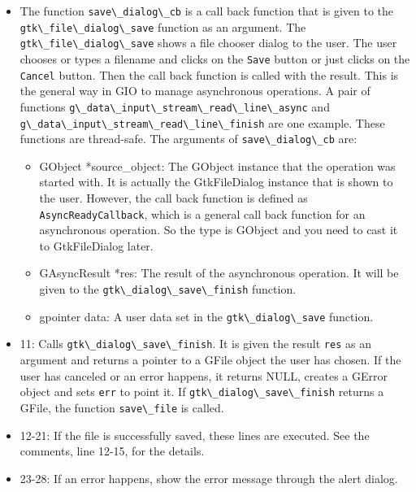\begin{itemize}
\tightlist
\item
  The function \passthrough{\lstinline!save\_dialog\_cb!} is a call back
  function that is given to the
  \passthrough{\lstinline!gtk\_file\_dialog\_save!} function as an
  argument. The \passthrough{\lstinline!gtk\_file\_dialog\_save!} shows
  a file chooser dialog to the user. The user chooses or types a
  filename and clicks on the \passthrough{\lstinline!Save!} button or
  just clicks on the \passthrough{\lstinline!Cancel!} button. Then the
  call back function is called with the result. This is the general way
  in GIO to manage asynchronous operations. A pair of functions
  \passthrough{\lstinline!g\_data\_input\_stream\_read\_line\_async!}
  and
  \passthrough{\lstinline!g\_data\_input\_stream\_read\_line\_finish!}
  are one example. These functions are thread-safe. The arguments of
  \passthrough{\lstinline!save\_dialog\_cb!} are:

  \begin{itemize}
  \tightlist
  \item
    GObject *source\_object: The GObject instance that the operation was
    started with. It is actually the GtkFileDialog instance that is
    shown to the user. However, the call back function is defined as
    \passthrough{\lstinline!AsyncReadyCallback!}, which is a general
    call back function for an asynchronous operation. So the type is
    GObject and you need to cast it to GtkFileDialog later.
  \item
    GAsyncResult *res: The result of the asynchronous operation. It will
    be given to the \passthrough{\lstinline!gtk\_dialog\_save\_finish!}
    function.
  \item
    gpointer data: A user data set in the
    \passthrough{\lstinline!gtk\_dialog\_save!} function.
  \end{itemize}
\item
  11: Calls \passthrough{\lstinline!gtk\_dialog\_save\_finish!}. It is
  given the result \passthrough{\lstinline!res!} as an argument and
  returns a pointer to a GFile object the user has chosen. If the user
  has canceled or an error happens, it returns NULL, creates a GError
  object and sets \passthrough{\lstinline!err!} to point it. If
  \passthrough{\lstinline!gtk\_dialog\_save\_finish!} returns a GFile,
  the function \passthrough{\lstinline!save\_file!} is called.
\item
  12-21: If the file is successfully saved, these lines are executed.
  See the comments, line 12-15, for the details.
\item
  23-28: If an error happens, show the error message through the alert
  dialog.
\end{itemize}

